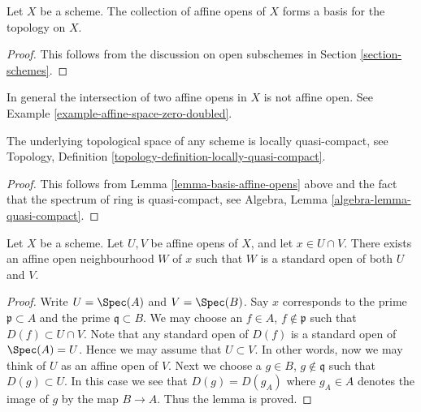 \begin{lemma}
\label{lemma-basis-affine-opens}
Let $X$ be a scheme. The collection of affine opens
of $X$ forms a basis for the topology on $X$.
\end{lemma}

\begin{proof}
This follows from the discussion on open subschemes
in Section \ref{section-schemes}.
\end{proof}

\begin{remark}
\label{remark-intersection-affine-opens}
In general the intersection of two affine opens in $X$
is not affine open. See Example \ref{example-affine-space-zero-doubled}.
\end{remark}

\begin{lemma}
\label{lemma-locally-quasi-compact}
The underlying topological space of any scheme is
locally quasi-compact, see
Topology, Definition \ref{topology-definition-locally-quasi-compact}.
\end{lemma}

\begin{proof}
This follows from Lemma \ref{lemma-basis-affine-opens} above
and the fact that the spectrum of ring is quasi-compact, see
Algebra, Lemma \ref{algebra-lemma-quasi-compact}.
\end{proof}

\begin{lemma}
\label{lemma-standard-open-two-affines}
Let $X$ be a scheme.
Let $U, V$ be affine opens of $X$, and let $x \in U \cap V$.
There exists an affine open neighbourhood $W$ of $x$
such that $W$ is a standard open of both $U$ and $V$.
\end{lemma}

\begin{proof}
Write $U = \Spec(A)$ and $V = \Spec(B)$.
Say $x$ corresponds to the prime $\mathfrak p \subset A$
and the prime $\mathfrak q \subset B$.
We may choose an $f \in A$, $f \not \in \mathfrak p$ such that
$D(f) \subset U \cap V$. Note that any standard open of $D(f)$
is a standard open of $\Spec(A) = U$. Hence we may assume
that $U \subset V$. In other words, now we may think of $U$
as an affine open of $V$. Next we choose a
$g \in B$, $g \not \in \mathfrak q$ such that
$D(g) \subset U$. In this case we see that $D(g) = D(g_A)$
where $g_A \in A$ denotes the image of $g$ by the map $B \to A$.
Thus the lemma is proved.
\end{proof}

